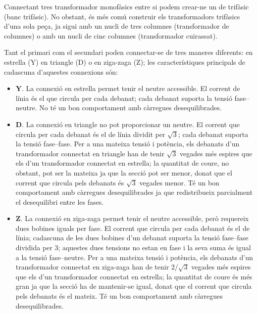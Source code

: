 Connectant tres transformador monofàsics entre si podem crear-ne un de trifàsic (banc trifàsic). No obstant, és més comú construir els transformadors trifàsics d'una sola peça, ja sigui amb un nucli de tres columnes (transformador de columnes) o amb un nucli de cinc columnes (transformador cuirassat).

Tant el primari com el secundari poden connectar-se de tres maneres diferents: en estrella (Y) en triangle (D) o en ziga-zaga (Z); les característiques principals de cadascuna d'aquestes connexions són:

\begin{itemize}
   \item \textbf{Y}. La connexió en estrella permet tenir el neutre accessible. El corrent de línia és el que circula per cada debanat; cada debanat suporta la tensió fase--neutre. No té un bon comportament amb càrregues desequilibrades.
   \item \textbf{D}. La connexió en triangle no pot proporcionar un neutre. El corrent que circula per cada debanat és el de línia dividit per $\sqrt{3}$; cada debanat suporta la tensió fase--fase. Per a una mateixa tensió i potència, els debanats d'un transformador connectat en triangle han de tenir $\sqrt{3}$ vegades més espires que els d'un transformador connectat en estrella; la quantitat de coure, no obstant, pot ser la mateixa ja que la secció pot ser menor, donat que el corrent que circula pels debanats és $\sqrt{3}$ vegades menor. Té un bon comportament amb càrregues desequilibrades ja que redistribueix parcialment el desequilibri entre les fases.
   \item \textbf{Z}. La connexió en ziga-zaga permet tenir el neutre accessible, però requereix dues bobines iguals per fase. El corrent que circula per cada debanat és el de línia; cadascuna de les dues bobines d'un debanat suporta la tensió fase--fase dividida per 3; aquestes dues tensions no estan en fase i la seva suma és igual a la tensió fase--neutre. Per a una mateixa tensió i potència, els debanats d'un transformador connectat en ziga-zaga han de tenir $2/\sqrt{3}$ vegades més espires que els d'un transformador connectat en estrella; la quantitat de coure és més gran ja que la secció ha de mantenir-se igual, donat que el corrent que circula pels debanats és el mateix. Té un bon comportament amb càrregues desequilibrades.
\end{itemize}

